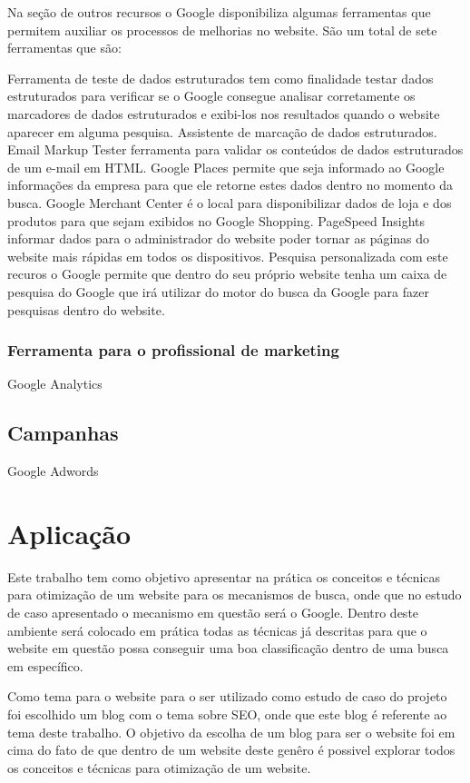 \documentclass[
	12pt,				%
	openright,			%
	twoside,			%
	a4paper,			%
	english,			%
	french,				%
	spanish,			%
	brazil				%
	]{abntex2}
\begin{document}
Na seção de outros recursos o Google disponibiliza algumas ferramentas que permitem auxiliar os processos de melhorias no website. São um total de sete ferramentas que são: 

Ferramenta de teste de dados estruturados tem como finalidade testar dados estruturados para verificar se o Google consegue analisar corretamente os marcadores de dados estruturados e exibi-los nos resultados quando o website aparecer em alguma pesquisa.
Assistente de marcação de dados estruturados.
Email Markup Tester ferramenta para validar os conteúdos de dados estruturados de um e-mail em HTML.
Google Places permite que seja informado ao Google informações da empresa para que ele retorne estes dados dentro no momento da busca.
Google Merchant Center é o local para disponibilizar dados de loja e dos produtos para que sejam exibidos no Google Shopping.
PageSpeed Insights informar dados para o administrador do website poder tornar as páginas do website mais rápidas em todos os dispositivos.
Pesquisa personalizada com este recuros o Google permite que dentro do seu próprio website tenha um caixa de pesquisa do Google que irá utilizar do motor do busca da Google para fazer pesquisas dentro do website.

\subsection{Ferramenta para o profissional de marketing}

Google Analytics

\section{Campanhas}

Google Adwords

\chapter{Aplicação}

Este trabalho tem como objetivo apresentar na prática os conceitos e técnicas para otimização de um website para os mecanismos de busca, onde que no estudo de caso apresentado o mecanismo em questão será o Google. Dentro deste ambiente será colocado em prática todas as técnicas já descritas para que o website em questão possa conseguir uma boa classificação dentro de uma busca em específico.

Como tema para o website para o ser utilizado como estudo de caso do projeto foi escolhido um blog com o tema sobre SEO, onde que este blog é referente ao tema deste trabalho. O objetivo da escolha de um blog para ser o website foi em cima do fato de que dentro de um website deste genêro é possivel explorar todos os conceitos e técnicas para otimização de um website.
\end{document}
